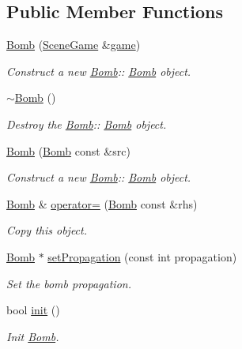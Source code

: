 \subsection*{Public Member Functions}
\begin{DoxyCompactItemize}
\item 
\hyperlink{class_bomb_aa09b8879ab7aae611b05ad0e73e45696}{Bomb} (\hyperlink{class_scene_game}{Scene\+Game} \&\hyperlink{class_a_entity_aa2c05db944a8b7487eb8470dd20211ab}{game})
\begin{DoxyCompactList}\small\item\em Construct a new \hyperlink{class_bomb}{Bomb}\+:\+: \hyperlink{class_bomb}{Bomb} object. \end{DoxyCompactList}\item 
\mbox{\label{class_bomb_acbb47327cfb2fa429887774ef3597965}} 
\hyperlink{class_bomb_acbb47327cfb2fa429887774ef3597965}{$\sim$\+Bomb} ()
\begin{DoxyCompactList}\small\item\em Destroy the \hyperlink{class_bomb}{Bomb}\+:\+: \hyperlink{class_bomb}{Bomb} object. \end{DoxyCompactList}\item 
\hyperlink{class_bomb_ad02ddab443979d610ea5ad04343bd7fa}{Bomb} (\hyperlink{class_bomb}{Bomb} const \&src)
\begin{DoxyCompactList}\small\item\em Construct a new \hyperlink{class_bomb}{Bomb}\+:\+: \hyperlink{class_bomb}{Bomb} object. \end{DoxyCompactList}\item 
\hyperlink{class_bomb}{Bomb} \& \hyperlink{class_bomb_a85eb751af149c92278eafdbabced0d3d}{operator=} (\hyperlink{class_bomb}{Bomb} const \&rhs)
\begin{DoxyCompactList}\small\item\em Copy this object. \end{DoxyCompactList}\item 
\hyperlink{class_bomb}{Bomb} $\ast$ \hyperlink{class_bomb_a3a3488cb6bd66f3b6d73003814dfb209}{set\+Propagation} (const int propagation)
\begin{DoxyCompactList}\small\item\em Set the bomb propagation. \end{DoxyCompactList}\item 
bool \hyperlink{class_bomb_a4a3f751937f59953f4cf585b07c9684c}{init} ()
\begin{DoxyCompactList}\small\item\em Init \hyperlink{class_bomb}{Bomb}. \end{DoxyCompactList}\item 

\end{DoxyCompactItemize}

